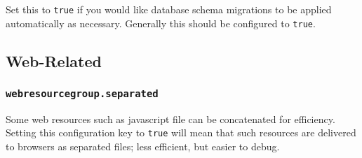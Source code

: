 Set this to {\tt true} if you would like database schema migrations to be applied automatically as necessary.  Generally this should be configured to {\tt true}.

\subsection{Web-Related}

\subsubsection{\tt webresourcegroup.separated}

Some web resources such as javascript file can be concatenated for efficiency.  Setting this configuration key to {\tt true} will mean that such resources are delivered to browsers as separated files; less efficient, but easier to debug.
